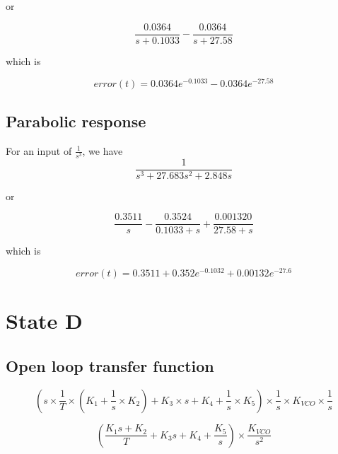 or 

\begin{equation}
\frac{0.0364}{s+0.1033} -\frac{0.0364}{s+27.58}
\end{equation}

which is 

\begin{equation}
error(t) =  0.0364e^{-0.1033} - 0.0364e^{-27.58}
\end{equation}


\subsection{Parabolic response}

For an input of $\frac{1}{s^3}$, we have 
\begin{equation}
\frac{1}{s^3 +27.683 s^2 + 2.848 s}
\end{equation}


or 

\begin{equation}
\frac{0.3511}{s}-\frac{0.3524}{0.1033+s}
+\frac{0.001320}{27.58+s}
\end{equation}

which is

\begin{equation}
error(t) = 0.3511 + 0.352 e^{-0.1032} + 0.00132 e^{-27.6}
\end{equation}

\clearpage
\section{State D}



\subsection{Open loop transfer function}
\begin{comment}
(18, 1)
(1, array([ 0.        ,  0.01131368,  0.00022784]))
(18, 1)
(2, array([ 55.06692161,   4.63278117,   0.77306969]))
\end{comment}

\begin{equation}
(s \times \frac{1}{T} \times (K_1 + \frac{1}{s} \times K_2) + K_3 \times s + K_4 + \frac{1}{s} \times K_5) \times \frac{1}{s} \times K_{VCO} \times \frac{1}{s}
\end{equation}

\begin{equation}
(\frac{K_1 s + K_2}{T} + K_3  s + K_4 + \frac{K_5}{s} ) \times \frac{K_{VCO}}{s^2}
\end{equation}

